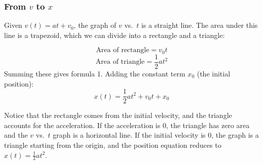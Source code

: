 \documentclass[]{article}
\begin{document}
		\subsubsection*{From $v$ to $x$}
		Given $v(t) = at+v_0$, the graph of $v$ vs.\ $t$ is a straight line. The area under this line is a trapezoid, which we can divide into a rectangle and a triangle:
		\begin{center}
		\end{center}
		\[\text{Area of rectangle} = v_0 t\]
		\[\text{Area of triangle} = \frac{1}{2} a t^2\]
		Summing these gives formula 1. Adding the constant term $x_0$ (the initial position):
		\[x(t) = \frac{1}{2}at^2 + v_0 t + x_0\]
		
		Notice that the rectangle comes from the initial velocity, and the triangle accounts for the acceleration. If the acceleration is $0$, the triangle has zero area and the $v$ vs.\ $t$ graph is a horizontal line. If the initial velocity is $0$, the graph is a triangle starting from the origin, and the position equation reduces to $x(t) = \frac{1}{2} a t^2$.
				
\end{document}
